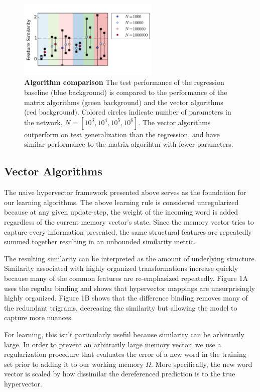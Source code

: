 \documentclass{article}
\begin{document}
\begin{figure}[h]
\centering
\includegraphics[width=0.6\textwidth]{algorithm_comparison-170519.png}
\caption{\textbf{Algorithm comparison} The test performance of the regression baseline (blue background) is compared to the performance of the matrix algorithms (green background) and the vector algorithms (red background). Colored circles indicate number of parameters in the network, $N=[10^3, 10^4, 10^5, 10^6]$. The vector algorithms outperform on test generalization than the regression, and have similar performance to the matrix algorihtm with fewer parameters.}
\end{figure}

\subsection{Vector Algorithms}

The naive hypervector framework presented above serves as the foundation for our learning algorithms. The above learning rule is considered unregularized because at any given update-step, the weight of the incoming word is added regardless of the current memory vector's state. Since the memory vector tries to capture every information presented, the same structural features are repeatedly summed together resulting in an unbounded similarity metric.

The resulting similarity can be interpreted as the amount of underlying structure. Similarity associated with highly organized transformations increase quickly because many of the common features are re-emphasized repeatedly. Figure 1A  uses the regular binding and shows that hypervector mappings are unsurprisingly highly organized. Figure 1B shows that the difference binding removes many of the redundant trigrams, decreasing the similarity but allowing the model to capture more nuances.

For learning, this isn't particularly useful because similarity can be arbitrarily large. In order to prevent an arbitrarily large memory vector, we use a regularization procedure that evaluates the error of a new word in the training set prior to adding it to our working memory $\Omega$. More specifically, the new word vector is scaled by how dissimilar the dereferenced prediction is to the true hypervector.
\end{document}
